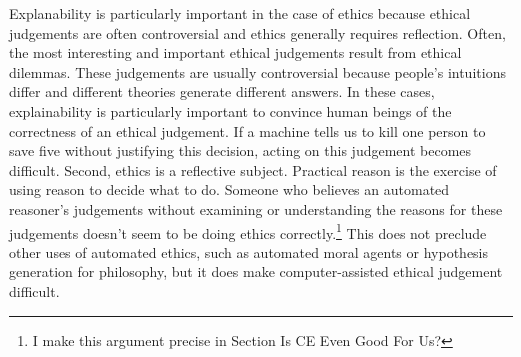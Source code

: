 \begin{isabellebody}
\begin{isamarkuptext}
Explanability is particularly important in the case of ethics because ethical judgements are often 
controversial and ethics generally requires reflection. Often, the most interesting and important
ethical judgements result from ethical dilemmas. These judgements are usually controversial 
because people's intuitions differ and different theories generate different answers. In these cases,
explainability is particularly important to convince human beings of the correctness of an ethical 
judgement. If a machine tells us to kill one person to save five without justifying this decision, 
acting on this judgement becomes difficult. Second, ethics is a reflective subject. Practical reason 
is the exercise of using reason to decide what to do. Someone who believes an automated reasoner's 
judgements without examining or understanding the reasons for these judgements doesn't seem to be 
doing ethics correctly.\footnote{I make this argument precise in Section Is CE Even Good For Us?} 
This does not preclude other uses of automated ethics, such as automated moral agents or hypothesis 
generation for philosophy, but it does make computer-assisted ethical judgement difficult. 


\end{isamarkuptext}
\end{isabellebody}

